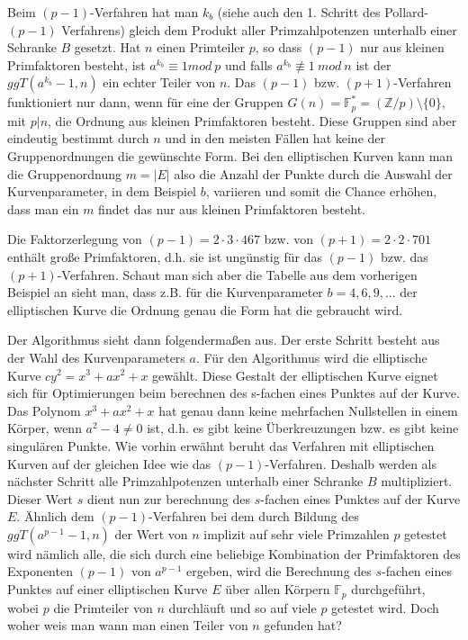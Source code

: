 \documentclass[10pt, bigheadings]{scrartcl}
\begin{document}
Beim $(p-1)$-Verfahren hat man $k_b$ (siehe
auch den 1. Schritt des Pollard-$(p-1)$ Verfahrens) gleich dem Produkt aller
Primzahlpotenzen unterhalb einer Schranke $B$ gesetzt. Hat $n$ einen Primteiler 
$p$, so dass $(p-1)$ nur aus kleinen Primfaktoren besteht, ist
$a^{k_b} \equiv 1 mod\ p$ und falls  $a^{k_b}\not\equiv 1\ mod\ n $ ist der 
$ggT(a^{k_b}-1,n)$ ein echter Teiler von $n$. 
Das $(p-1)$ bzw. $(p+1)$-Verfahren funktioniert nur dann, wenn für eine der 
Gruppen $G(n) = \mathbb F_p^* = (\mathbb Z/p)\setminus\{0\}$, mit $p|n$, die
Ordnung aus
kleinen Primfaktoren besteht. Diese Gruppen sind aber eindeutig bestimmt durch 
$n$ und in den meisten Fällen hat keine der Gruppenordnungen die gewünschte 
Form. Bei den elliptischen Kurven kann man die Gruppenordnung $m=|E|$ also die
Anzahl der Punkte durch die Auswahl der Kurvenparameter, in dem Beispiel $b$, 
variieren und somit die Chance erhöhen, dass man ein $m$ findet das nur aus 
kleinen Primfaktoren besteht. 

Die Faktorzerlegung von $(p-1) = 2\cdot3\cdot467$ bzw. von
$(p+1) = 2\cdot2\cdot701$ enthält große Primfaktoren, d.h. sie ist ungünstig für
das $(p-1)$ bzw. das $(p+1)$-Verfahren. Schaut man sich aber die Tabelle aus 
dem vorherigen Beispiel an sieht man, dass z.B. für die Kurvenparameter 
$b=4,6,9, ...$ der elliptischen Kurve die Ordnung genau die Form hat die 
gebraucht wird.

Der Algorithmus sieht dann folgendermaßen aus. Der erste Schritt besteht aus 
der Wahl des Kurvenparameters $a$. Für den Algorithmus wird die 
elliptische Kurve $cy^2 = x^3 + ax^2 +x$ gewählt. Diese Gestalt der 
elliptischen Kurve eignet sich für Optimierungen beim berechnen des s-fachen
eines Punktes auf der Kurve. Das Polynom $x^3+ax^2+x$ hat genau dann keine
mehrfachen Nullstellen in einem Körper, wenn $a^2-4\neq 0$ ist, d.h. es gibt
keine Überkreuzungen bzw. es gibt keine singulären Punkte. 
Wie vorhin erwähnt beruht das Verfahren mit elliptischen Kurven auf der gleichen
Idee wie das  $(p-1)$-Verfahren. Deshalb werden als nächster Schritt alle
Primzahlpotenzen unterhalb einer Schranke $B$
multipliziert. Dieser Wert $s$
dient nun zur berechnung des $s$-fachen eines Punktes auf der Kurve
$E$. Ähnlich dem $(p-1)$-Verfahren bei dem durch Bildung des 
$ggT(a^{p-1}-1,n)$ der Wert von $n$ implizit auf sehr viele Primzahlen $p$
getestet wird nämlich alle, die sich durch eine beliebige Kombination der 
Primfaktoren des Exponenten $(p-1)$ von $a^{p-1}$ ergeben, wird die Berechnung
des $s$-fachen eines Punktes auf einer elliptischen Kurve $E$ über allen 
Körpern $\mathbb F_p$ durchgeführt, wobei $p$ die Primteiler von $n$ durchläuft
und so auf viele $p$ getestet wird. Doch woher weis man wann man einen Teiler 
 von $n$ gefunden hat? 
\end{document}
